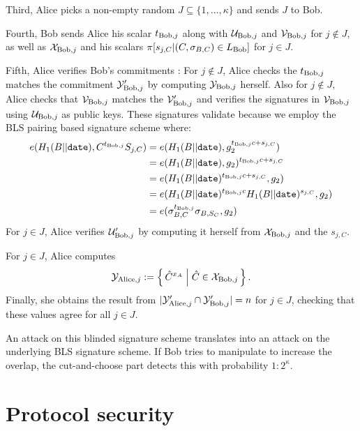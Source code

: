 \documentclass{article}
\begin{document}
Third, Alice picks a non-empty random $J \subseteq \{1,\ldots,\kappa\}$
 and sends $J$ to Bob.

Fourth, Bob sends
 Alice his scalar $t_{{\textrm{Bob}},j}$ along with
 ${\cal U}_{{\textrm{Bob}},j}$ and ${\cal V}_{{\textrm{Bob}},j}$ for $j \notin J$,
as well as
 ${\cal X}_{{\textrm{Bob}},j}$ and his scalars
 $\pi [ s_{j,C} | (C, \sigma_{B,C}) \in L_{\textrm{Bob}} ]$ for $j \in J$.

Fifth, Alice verifies Bob's commitments :
For $j \notin J$, Alice checks the $t_{{\textrm{Bob}},j}$ matches the
 commitment ${\cal Y}'_{{\textrm{Bob}},j}$ by computing ${\cal Y}_{{\textrm{Bob}},j}$ herself.
Also for $j \notin J$, Alice checks that ${\cal V}_{{\textrm{Bob}},j}$
 matches the ${\cal V}'_{{\textrm{Bob}},j}$ and verifies the signatures in
 ${\cal V}_{{\textrm{Bob}},j}$ using ${\cal U}_{{\textrm{Bob}},j}$ as public keys.
These signatures validate because we employ the BLS pairing based
signature scheme where:
\begin{align*}
 e( H_1(B||\texttt{date}), C^{t_{{\textrm{Bob}},j}} S_{j,C} )
 &= e (H_1(B||\texttt{date}), g_2^{t_{{\textrm{Bob}},j} c + s_{j,C}}) \\
 &= e( H_1(B||\texttt{date}), g_2 )^{t_{{\textrm{Bob}},j} c + s_{j,C}} \\
 &= e( H_1(B||\texttt{date})^{t_{{\textrm{Bob}},j}c + s_{j,C}}, g_2 ) \\
 &= e( H_1(B||\texttt{date})^{t_{{\textrm{Bob}},j}c} H_1(B||\texttt{date})^{s_{j,C}}, g_2 ) \\
 &= e( \sigma_{B,C}^{t_{{\textrm{Bob}},j}} \sigma_{B,S_C}, g_2 )
\end{align*}
For $j \in J$, Alice verifies ${\cal U}'_{{\textrm{Bob}},j}$ by computing it
 herself from ${\cal X}_{{\textrm{Bob}},j}$ and the $s_{j,C}$.

For $j\in J$, Alice computes
\begin{equation}
  {\cal Y}_{\Alice,j} :=
  \Setst{ \hat{C}^{x_A}}{ \hat{C} \in {\cal X}_{\Bob,j} }
  \mathperiod
\end{equation}
Finally, she obtains the result from
$|{\cal Y}'_{{\textrm{Alice}},j} \cap {\cal Y}'_{{\textrm{Bob}},j}| = n$ for $j \in J$,
checking that these values agree for all $j \in J$.

An attack on this blinded signature scheme translates into an attack
on the underlying BLS signature scheme.  If Bob tries to manipulate to
increase the overlap, the cut-and-choose part detects this with
probability $1:2^\kappa$.


\section{Protocol security}
\end{document}
